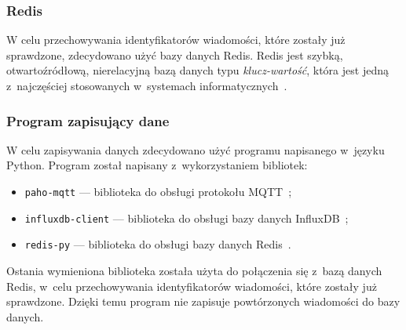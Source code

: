 \subsubsection{Redis}\label{impl:redis}
W celu przechowywania identyfikatorów wiadomości, które zostały już sprawdzone, zdecydowano użyć bazy danych Redis.
Redis jest szybką, otwartoźródłową, nierelacyjną bazą danych typu \emph{klucz-wartość}, która jest jedną z~najczęściej stosowanych w~systemach informatycznych~\cite{tool:redis}.

\subsubsection{Program zapisujący dane}\label{impl:save}
W celu zapisywania danych zdecydowano użyć programu napisanego w~języku Python.
Program został napisany z~wykorzystaniem bibliotek:
\begin{itemize}
    \item \texttt{paho-mqtt} — biblioteka do obsługi protokołu MQTT~\cite{py:paho-mqtt};
    \item \texttt{influxdb-client} — biblioteka do obsługi bazy danych InfluxDB~\cite{py:influxdb};
    \item \texttt{redis-py} — biblioteka do obsługi bazy danych Redis~\cite{py:redis}.
\end{itemize}

Ostania wymieniona biblioteka została użyta do połączenia się z~bazą danych Redis, w~celu przechowywania identyfikatorów wiadomości, które zostały już sprawdzone.
Dzięki temu program nie zapisuje powtórzonych wiadomości do bazy danych.

